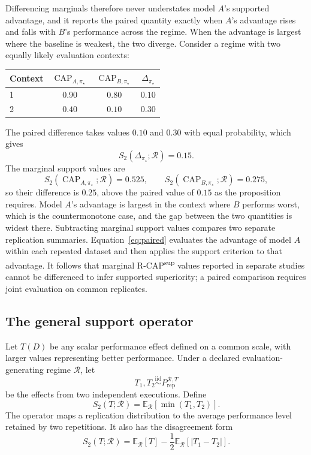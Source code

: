\documentclass[11pt]{article}
\newcommand{\CAP}{\operatorname{CAP}}
\newcommand{\Regime}{\mathcal{R}}
\newcommand{\E}{\mathbb{E}}
\newcommand{\iid}{\mathrel{\overset{\mathrm{iid}}{\sim}}}
\theoremstyle{remark}
\begin{document}
Differencing marginals therefore never understates model $A$'s supported advantage, and it reports the paired quantity exactly when $A$'s advantage rises and falls with $B$'s performance across the regime. When the advantage is largest where the baseline is weakest, the two diverge. Consider a regime with two equally likely evaluation contexts:
\begin{center}
\begin{tabular}{@{}lccc@{}}
\toprule
Context & $\CAP_{A,\pi_\star}$ & $\CAP_{B,\pi_\star}$ & $\Delta_{\pi_\star}$ \\
\midrule
1 & $0.90$ & $0.80$ & $0.10$ \\
2 & $0.40$ & $0.10$ & $0.30$ \\
\bottomrule
\end{tabular}
\end{center}
The paired difference takes values $0.10$ and $0.30$ with equal probability, which gives
\[
S_2(\Delta_{\pi_\star};\Regime)=0.15.
\]
The marginal support values are
\[
S_2(\CAP_{A,\pi_\star};\Regime)=0.525,
\qquad
S_2(\CAP_{B,\pi_\star};\Regime)=0.275,
\]
so their difference is $0.25$, above the paired value of $0.15$ as the proposition requires. Model $A$'s advantage is largest in the context where $B$ performs worst, which is the countermonotone case, and the gap between the two quantities is widest there. Subtracting marginal support values compares two separate replication summaries. Equation~\eqref{eq:paired} evaluates the advantage of model $A$ within each repeated dataset and then applies the support criterion to that advantage. It follows that marginal R-CAP\textsuperscript{sup} values reported in separate studies cannot be differenced to infer supported superiority; a paired comparison requires joint evaluation on common replicates.

\subsection{The general support operator}

Let $T(D)$ be any scalar performance effect defined on a common scale, with larger values representing better performance. Under a declared evaluation-generating regime $\Regime$, let
\[
T_1,T_2
\iid
P_{\mathrm{rep}}^{\Regime,T}
\]
be the effects from two independent executions. Define
\begin{equation}
S_2(T;\Regime)
=
\E_{\Regime}
\left[
\min(T_1,T_2)
\right].
\label{eq:general}
\end{equation}
The operator maps a replication distribution to the average performance level retained by two repetitions. It also has the disagreement form
\begin{equation}
S_2(T;\Regime)
=
\E_{\Regime}[T]
-
\frac12
\E_{\Regime}[|T_1-T_2|].
\label{eq:general-decomposition}
\end{equation}
\end{document}
